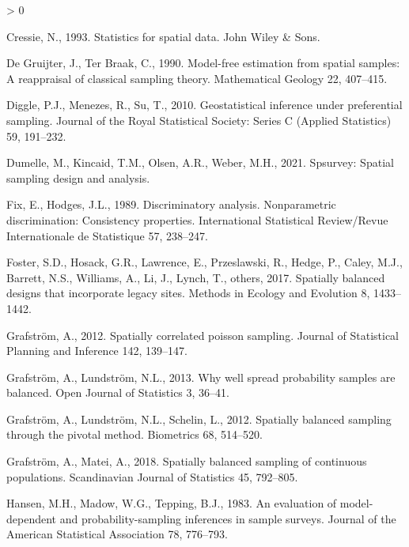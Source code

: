 \documentclass[]{elsarticle} %
\newlength{\cslhangindent}
\newenvironment{CSLReferences}[2] %
 {%
  \setlength{\parindent}{0pt}
  \ifodd #1 \everypar{\setlength{\hangindent}{\cslhangindent}}\ignorespaces\fi
  \ifnum #2 > 0
  \setlength{\parskip}{#2\baselineskip}
  \fi
 }%
 {}
\begin{document}
\begin{CSLReferences}{1}{0}
\leavevmode\hypertarget{ref-cressie1993statistics}{}%
Cressie, N., 1993. Statistics for spatial data. John Wiley \& Sons.

\leavevmode\hypertarget{ref-de1990model}{}%
De Gruijter, J., Ter Braak, C., 1990. Model-free estimation from spatial
samples: A reappraisal of classical sampling theory. Mathematical
Geology 22, 407--415.

\leavevmode\hypertarget{ref-diggle2010geostatistical}{}%
Diggle, P.J., Menezes, R., Su, T., 2010. Geostatistical inference under
preferential sampling. Journal of the Royal Statistical Society: Series
C (Applied Statistics) 59, 191--232.

\leavevmode\hypertarget{ref-dumelle2021spsurvey}{}%
Dumelle, M., Kincaid, T.M., Olsen, A.R., Weber, M.H., 2021. Spsurvey:
Spatial sampling design and analysis.

\leavevmode\hypertarget{ref-fix1989discriminatory}{}%
Fix, E., Hodges, J.L., 1989. Discriminatory analysis. Nonparametric
discrimination: Consistency properties. International Statistical
Review/Revue Internationale de Statistique 57, 238--247.

\leavevmode\hypertarget{ref-foster2017spatially}{}%
Foster, S.D., Hosack, G.R., Lawrence, E., Przeslawski, R., Hedge, P.,
Caley, M.J., Barrett, N.S., Williams, A., Li, J., Lynch, T., others,
2017. Spatially balanced designs that incorporate legacy sites. Methods
in Ecology and Evolution 8, 1433--1442.

\leavevmode\hypertarget{ref-grafstrom2012spatiallypoisson}{}%
Grafström, A., 2012. Spatially correlated poisson sampling. Journal of
Statistical Planning and Inference 142, 139--147.

\leavevmode\hypertarget{ref-grafstrom2013well}{}%
Grafström, A., Lundström, N.L., 2013. Why well spread probability
samples are balanced. Open Journal of Statistics 3, 36--41.

\leavevmode\hypertarget{ref-grafstrom2012spatially}{}%
Grafström, A., Lundström, N.L., Schelin, L., 2012. Spatially balanced
sampling through the pivotal method. Biometrics 68, 514--520.

\leavevmode\hypertarget{ref-grafstrom2018spatially}{}%
Grafström, A., Matei, A., 2018. Spatially balanced sampling of
continuous populations. Scandinavian Journal of Statistics 45, 792--805.

\leavevmode\hypertarget{ref-hansen1983evaluation}{}%
Hansen, M.H., Madow, W.G., Tepping, B.J., 1983. An evaluation of
model-dependent and probability-sampling inferences in sample surveys.
Journal of the American Statistical Association 78, 776--793.


\end{CSLReferences}
\end{document}
